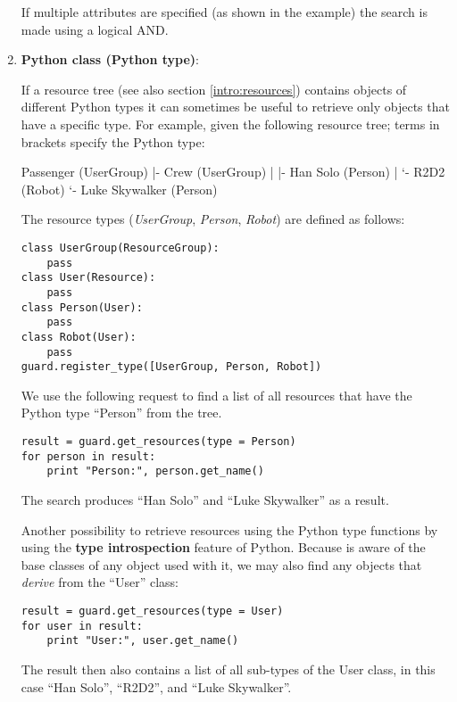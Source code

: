 \begin{enumerate}
If multiple attributes are specified (as shown in the example) the search 
is made using a logical AND.

\item {\bf Python class (Python type)}: 

If a resource tree (see also section \ref{intro:resources}) contains objects 
of different Python types it can sometimes be useful to retrieve only objects 
that have a specific type. For example, given the following resource tree; 
terms in brackets specify the Python type: 

\begin{indentverb}
Passenger (UserGroup)
  |- Crew (UserGroup)
  |   |- Han Solo (Person)
  |   `- R2D2 (Robot)
  `- Luke Skywalker (Person)
\end{indentverb}

The resource types ({\it UserGroup}, {\it Person}, {\it Robot}) are defined 
as follows:

\begin{lstlisting}
class UserGroup(ResourceGroup):
    pass
class User(Resource):
    pass
class Person(User):
    pass
class Robot(User):
    pass
guard.register_type([UserGroup, Person, Robot])
\end{lstlisting}

We use the following request to find a list of all resources that have the 
Python type ``Person'' from the tree.

\begin{lstlisting}
result = guard.get_resources(type = Person)
for person in result:
    print "Person:", person.get_name()
\end{lstlisting}

The search produces ``Han Solo'' and ``Luke Skywalker'' as a result.

Another possibility to retrieve resources using the Python type functions 
by using the {\bf type introspection} feature of Python. Because \product 
is aware of the base classes of any object used with it, we may also find 
any objects that {\it derive} from the ``User'' class:

\begin{lstlisting}
result = guard.get_resources(type = User)
for user in result:
    print "User:", user.get_name()
\end{lstlisting}

The result then also contains a list of all sub-types of the User class, 
in this case ``Han Solo'', ``R2D2'', and ``Luke Skywalker''.
\end{enumerate}


